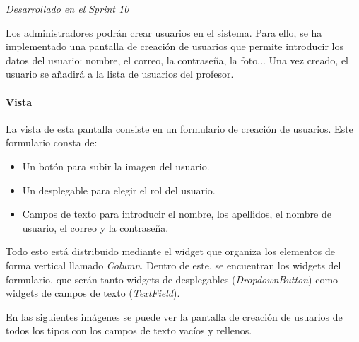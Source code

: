 \textit{Desarrollado en el Sprint 10}

Los administradores podrán crear usuarios en el sistema. Para ello, se ha implementado una pantalla de creación de usuarios que permite 
introducir los datos del usuario: nombre, el correo, la contraseña, la foto... Una vez creado, el usuario se añadirá a la lista de usuarios del profesor.


\paragraph*{Vista}
La vista de esta pantalla consiste en un formulario de creación de usuarios. Este formulario consta de:
\begin{itemize}
  \item Un botón para subir la imagen del usuario.
  \item Un desplegable para elegir el rol del usuario.
  \item Campos de texto para introducir el nombre, los apellidos, el nombre de usuario, el correo y la contraseña.
\end{itemize}


Todo esto está distribuido mediante el widget que organiza los elementos de forma vertical llamado \textit{Column}. 
Dentro de este, se encuentran los widgets del formulario, que serán tanto widgets de desplegables (\textit{DropdownButton}) como widgets de campos de texto (\textit{TextField}).

En las siguientes imágenes se puede ver la pantalla de creación de usuarios de todos los tipos con los campos de texto vacíos y rellenos.



